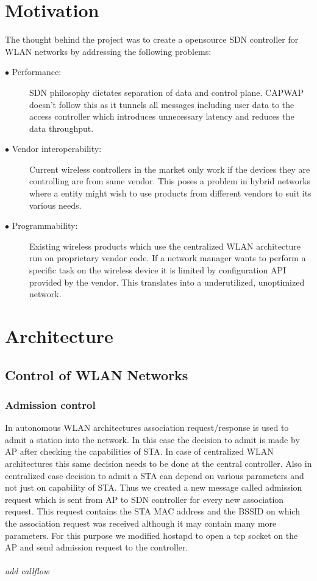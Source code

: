 \documentclass[12pt]{article}
\begin{document}
    \section{Motivation}
    The thought behind the project was to create a opensource SDN controller for WLAN networks by addressing the following problems:
    \begin{description}
    	\item[$\bullet$ Performance:] SDN philosophy dictates separation of data and control plane. CAPWAP  doesn't follow this as it tunnels all messages including user data to the access controller which introduces unnecessary latency and reduces the data throughput.
    	
    	\item[$\bullet$ Vendor interoperability:] Current wireless controllers in the market only work if the devices they are controlling are from same vendor. This poses a problem in hybrid networks where a entity might wish to use products from different vendors to suit its various needs.
    	 
    	 \item[$\bullet$ Programmability:] Existing wireless products which use the centralized WLAN architecture run on proprietary vendor code. If a network manager wants to perform a specific task on the wireless device it is limited by configuration API provided by the vendor. This translates into a underutilized, unoptimized network.
    \end{description}
    
    
     
    
    \section{Architecture}
\subsection{Control of WLAN Networks}
\subsubsection{Admission control}
In autonomous WLAN architectures association request/response is used to admit a station into the network. In this case the decision to admit is made by AP after checking the capabilities of STA. In case of centralized WLAN architectures this same decision needs to be done at the central controller. Also in centralized case decision to admit a STA can depend on various parameters and not just on capability of STA. Thus we created a new message called admission request which is sent from AP to SDN controller for every new association request. This request contains the STA MAC address and the BSSID on which the association request was received although it may contain many more parameters. For this purpose we modified hostapd\cite{hostapd} to open a tcp socket on the AP and send admission request to the controller. \\
\\ \textit{add callflow} 
\end{document}
